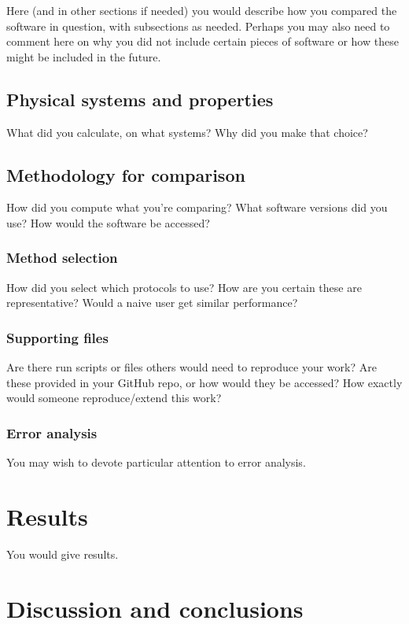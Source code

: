 \documentclass[9pt,software]{livecoms}
\begin{document}
Here (and in other sections if needed) you would describe how you compared the software in question, with subsections as needed.
Perhaps you may also need to comment here on why you did not include certain pieces of software or how these might be included in the future.

\subsection{Physical systems and properties}

What did you calculate, on what systems? Why did you make that choice?

\subsection{Methodology for comparison}
How did you compute what you're comparing?
What software versions did you use?
How would the software be accessed?


\subsubsection{Method selection}
How did you select which protocols to use? How are you certain these are representative? Would a naive user get similar performance?

\subsubsection{Supporting files}
Are there run scripts or files others would need to reproduce your work? Are these provided in your GitHub repo, or how would they be accessed?
How exactly would someone reproduce/extend this work?

\subsubsection{Error analysis}
You may wish to devote particular attention to error analysis.


\section{Results}

You would give results.


\section{Discussion and conclusions}
\end{document}
